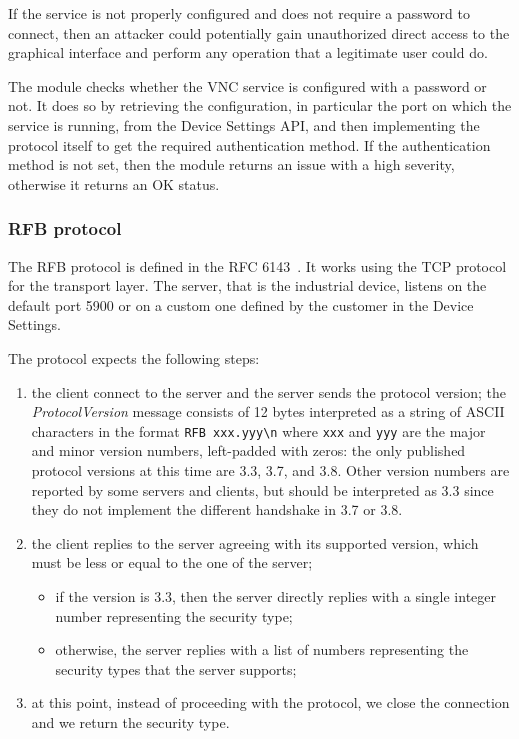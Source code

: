 If the service is not properly configured and does not require a password to connect, then an attacker could potentially gain unauthorized direct access to the graphical interface and perform any operation that a legitimate user could do.

The module checks whether the VNC service is configured with a password or not. It does so by retrieving the configuration, in particular the port on which the service is running, from the Device Settings API, and then implementing the protocol itself to get the required authentication method. If the authentication method is not set, then the module returns an issue with a high severity, otherwise it returns an OK status.

\subsubsection{RFB protocol}

The RFB protocol is defined in the RFC 6143~\cite{rfc6143}. It works using the TCP protocol for the transport layer. The server, that is the industrial device, listens on the default port 5900 or on a custom one defined by the customer in the Device Settings.

The protocol expects the following steps:

\begin{enumerate}
  \item the client connect to the server and the server sends the protocol version; the \textit{ProtocolVersion} message consists of 12 bytes interpreted as a string of ASCII characters in the format \texttt{RFB xxx.yyy\textbackslash n} where \texttt{xxx} and \texttt{yyy} are the major and minor version numbers, left-padded with zeros: the only published protocol versions at this time are 3.3, 3.7, and 3.8. Other version numbers are reported by some servers and clients, but should be interpreted as 3.3 since they do not implement the different handshake in 3.7 or 3.8.
  \item the client replies to the server agreeing with its supported version, which must be less or equal to the one of the server;
        \begin{itemize}
          \item if the version is 3.3, then the server directly replies with a single integer number representing the security type;
          \item otherwise, the server replies with a list of numbers representing the security types that the server supports;
        \end{itemize}
  \item at this point, instead of proceeding with the protocol, we close the connection and we return the security type.
\end{enumerate}

